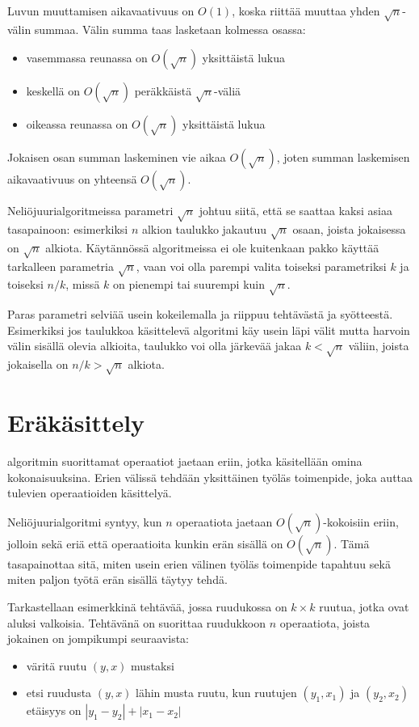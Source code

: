 Luvun muuttamisen aikavaativuus on
$O(1)$, koska riittää muuttaa yhden $\sqrt n$-välin summaa.
Välin summa taas lasketaan kolmessa osassa:

\begin{itemize}
\item vasemmassa reunassa on $O(\sqrt n)$ yksittäistä lukua
\item keskellä on $O(\sqrt n)$ peräkkäistä $\sqrt n$-väliä
\item oikeassa reunassa on $O(\sqrt n)$ yksittäistä lukua
\end{itemize}

Jokaisen osan summan laskeminen vie aikaa $O(\sqrt n)$,
joten summan laskemisen aikavaativuus on yhteensä $O(\sqrt n)$.

Neliöjuurialgoritmeissa parametri $\sqrt n$
johtuu siitä, että se saattaa kaksi asiaa tasapainoon:
esimerkiksi $n$ alkion taulukko jakautuu
$\sqrt n$ osaan, joista jokaisessa on $\sqrt n$ alkiota.
Käytännössä algoritmeissa
ei ole kuitenkaan pakko käyttää
tarkalleen parametria $\sqrt n$,
vaan voi olla parempi valita toiseksi
parametriksi $k$ ja toiseksi $n/k$,
missä $k$ on pienempi tai suurempi kuin $\sqrt n$.

Paras parametri selviää usein kokeilemalla
ja riippuu tehtävästä ja syötteestä.
Esimerkiksi jos taulukkoa käsittelevä algoritmi
käy usein läpi välit mutta harvoin välin sisällä
olevia alkioita, taulukko voi olla järkevää
jakaa $k < \sqrt n$ väliin,
joista jokaisella on $n/k > \sqrt n$ alkiota.

\section{Eräkäsittely}


 algoritmin suorittamat
operaatiot jaetaan eriin,
jotka käsitellään omina kokonaisuuksina.
Erien välissä tehdään yksittäinen työläs toimenpide,
joka auttaa tulevien operaatioiden käsittelyä.

Neliöjuurialgoritmi syntyy, kun $n$ operaatiota
jaetaan $O(\sqrt n)$-kokoisiin eriin,
jolloin sekä eriä että operaatioita kunkin erän
sisällä on $O(\sqrt n)$.
Tämä tasapainottaa sitä, miten usein erien välinen
työläs toimenpide tapahtuu sekä miten paljon työtä
erän sisällä täytyy tehdä.

Tarkastellaan esimerkkinä tehtävää, jossa
ruudukossa on $k \times k$ ruutua,
jotka ovat aluksi valkoisia.
Tehtävänä on suorittaa ruudukkoon
$n$ operaatiota,
joista jokainen on jompikumpi seuraavista:
\begin{itemize}
\item
väritä ruutu $(y,x)$ mustaksi
\item
etsi ruudusta $(y,x)$ lähin
musta ruutu, kun
ruutujen $(y_1,x_1)$ ja $(y_2,x_2)$
etäisyys on $|y_1-y_2|+|x_1-x_2|$
\end{itemize}

